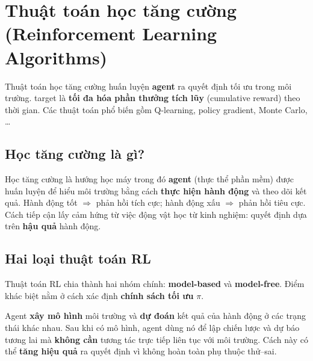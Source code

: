 \section{Thuật toán học tăng cường (Reinforcement Learning Algorithms)}
\label{sec:reinforcement-learning-algorithms}

\begin{dongco}[title={target học tăng cường}]
Thuật toán học tăng cường huấn luyện \textbf{agent} ra quyết định tối ưu trong môi trường.
target là \textbf{tối đa hóa phần thưởng tích lũy} (cumulative reward) theo thời gian.
Các thuật toán phổ biến gồm Q-learning, policy gradient, Monte Carlo, \ldots
\end{dongco}

\subsection{Học tăng cường là gì?}

\begin{dinhnghia}[title={Reinforcement Learning (RL)}]
Học tăng cường là hướng học máy trong đó \textbf{agent} (thực thể phần mềm) được huấn luyện để hiểu môi trường bằng cách \textbf{thực hiện hành động} và theo dõi kết quả.
Hành động tốt $\Rightarrow$ phản hồi tích cực; hành động xấu $\Rightarrow$ phản hồi tiêu cực.
Cách tiếp cận lấy cảm hứng từ việc động vật học từ kinh nghiệm: quyết định dựa trên \textbf{hậu quả} hành động.
\end{dinhnghia}

\subsection{Hai loại thuật toán RL}

\begin{ynghia}[title={Model-based và model-free}]
Thuật toán RL chia thành hai nhóm chính: \textbf{model-based} và \textbf{model-free}.
Điểm khác biệt nằm ở cách xác định \textbf{chính sách tối ưu} $\pi$.
\end{ynghia}

\begin{phuongphap}[title={Model-Based Reinforcement Learning}]
Agent \textbf{xây mô hình} môi trường và \textbf{dự đoán} kết quả của hành động ở các trạng thái khác nhau.
Sau khi có mô hình, agent dùng nó để lập chiến lược và dự báo tương lai mà \textbf{không cần} tương tác trực tiếp liên tục với môi trường.
Cách này có thể \textbf{tăng hiệu quả} ra quyết định vì không hoàn toàn phụ thuộc thử--sai.
\end{phuongphap}


